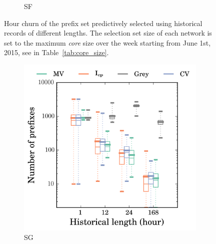 \begin{figure}
\begin{subfigure}[b]{0.48\textwidth}
                \caption{SF}
                \label{fig:churn_sf}
        \end{subfigure}
\caption{Hour churn of the prefix set predictively selected using historical records of different lengths. The selection set size of each network is set to the maximum \textit{core} size over the week starting from June 1st, 2015, see in Table~\ref{tab:core_size}.}
\label{fig:churn}
\end{figure}

\begin{figure}\ContinuedFloat 
        \begin{subfigure}[b]{0.48\textwidth}
                \includegraphics[width=\textwidth]{gfx/chap2/grey_churn_box_method_compare_fs_sg.png}
                \caption{SG}
                \label{fig:churn_sg}
        \end{subfigure}
        \begin{subfigure}[b]{0.48\textwidth}

\end{subfigure}
\end{figure}
